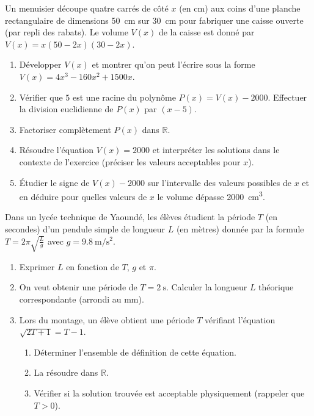 \documentclass[11pt]{article}
\begin{document}
\begin{exercice}
Un menuisier découpe quatre carrés de côté $x$ (en cm) aux coins d'une planche rectangulaire de dimensions \SI{50}{\centi\meter} sur \SI{30}{\centi\meter} pour fabriquer une caisse ouverte (par repli des rabats). Le volume $V(x)$ de la caisse est donné par $V(x) = x(50-2x)(30-2x)$.
\begin{enumerate}
    \item Développer $V(x)$ et montrer qu'on peut l'écrire sous la forme $V(x) = 4x^3 - 160x^2 + 1500x$.
    \item Vérifier que $5$ est une racine du polynôme $P(x) = V(x) - 2000$. Effectuer la division euclidienne de $P(x)$ par $(x-5)$.
    \item Factoriser complètement $P(x)$ dans $\mathbb{R}$.
    \item Résoudre l'équation $V(x) = 2000$ et interpréter les solutions dans le contexte de l'exercice (préciser les valeurs acceptables pour $x$).
    \item Étudier le signe de $V(x) - 2000$ sur l'intervalle des valeurs possibles de $x$ et en déduire pour quelles valeurs de $x$ le volume dépasse \SI{2000}{\centi\meter\cubed}.
\end{enumerate}
\end{exercice}

\begin{exercice}
Dans un lycée technique de Yaoundé, les élèves étudient la période $T$ (en secondes) d'un pendule simple de longueur $L$ (en mètres) donnée par la formule $T = 2\pi\sqrt{\frac{L}{g}}$ avec $g = \SI{9.8}{\meter\per\second\squared}$.
\begin{enumerate}
    \item Exprimer $L$ en fonction de $T$, $g$ et $\pi$.
    \item On veut obtenir une période de $T = \SI{2}{\second}$. Calculer la longueur $L$ théorique correspondante (arrondi au mm).
    \item Lors du montage, un élève obtient une période $T$ vérifiant l'équation $\sqrt{2T + 1} = T - 1$.
    \begin{enumerate}
        \item Déterminer l'ensemble de définition de cette équation.
        \item La résoudre dans $\mathbb{R}$.
        \item Vérifier si la solution trouvée est acceptable physiquement (rappeler que $T > 0$).
    \end{enumerate}
\end{enumerate}
\end{exercice}
\end{document}
